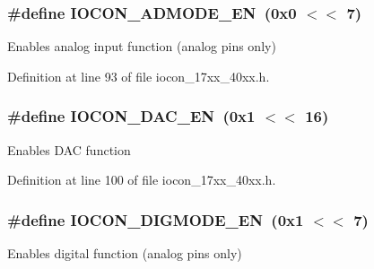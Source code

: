 \subsubsection[{\texorpdfstring{I\+O\+C\+O\+N\+\_\+\+A\+D\+M\+O\+D\+E\+\_\+\+EN}{IOCON_ADMODE_EN}}]{\setlength{\rightskip}{0pt plus 5cm}\#define I\+O\+C\+O\+N\+\_\+\+A\+D\+M\+O\+D\+E\+\_\+\+EN~(0x0 $<$$<$ 7)}\hypertarget{group__IOCON__17XX__40XX_ga9a3d4f3e281c382f795b9a769073d4e4}{}\label{group__IOCON__17XX__40XX_ga9a3d4f3e281c382f795b9a769073d4e4}
Enables analog input function (analog pins only) 

Definition at line 93 of file iocon\+\_\+17xx\+\_\+40xx.\+h.

\subsubsection[{\texorpdfstring{I\+O\+C\+O\+N\+\_\+\+D\+A\+C\+\_\+\+EN}{IOCON_DAC_EN}}]{\setlength{\rightskip}{0pt plus 5cm}\#define I\+O\+C\+O\+N\+\_\+\+D\+A\+C\+\_\+\+EN~(0x1 $<$$<$ 16)}\hypertarget{group__IOCON__17XX__40XX_gabb788549592ca772def19f2a8060aa3d}{}\label{group__IOCON__17XX__40XX_gabb788549592ca772def19f2a8060aa3d}
Enables D\+AC function 

Definition at line 100 of file iocon\+\_\+17xx\+\_\+40xx.\+h.

\subsubsection[{\texorpdfstring{I\+O\+C\+O\+N\+\_\+\+D\+I\+G\+M\+O\+D\+E\+\_\+\+EN}{IOCON_DIGMODE_EN}}]{\setlength{\rightskip}{0pt plus 5cm}\#define I\+O\+C\+O\+N\+\_\+\+D\+I\+G\+M\+O\+D\+E\+\_\+\+EN~(0x1 $<$$<$ 7)}\hypertarget{group__IOCON__17XX__40XX_ga516e9d9bc7b1f3aaefd9d09c6ece74d2}{}\label{group__IOCON__17XX__40XX_ga516e9d9bc7b1f3aaefd9d09c6ece74d2}
Enables digital function (analog pins only) 

